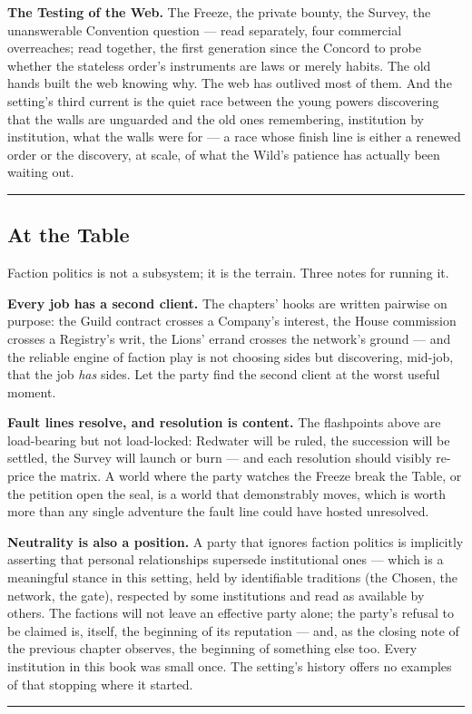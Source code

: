 \textbf{The Testing of the Web.} The Freeze, the private bounty, the Survey, the unanswerable Convention question --- read separately, four commercial overreaches; read together, the first generation since the Concord to probe whether the stateless order's instruments are laws or merely habits. The old hands built the web knowing why. The web has outlived most of them. And the setting's third current is the quiet race between the young powers discovering that the walls are unguarded and the old ones remembering, institution by institution, what the walls were for --- a race whose finish line is either a renewed order or the discovery, at scale, of what the Wild's patience has actually been waiting out.

\medskip\hrule\medskip

\subsection{At the Table}

Faction politics is not a subsystem; it is the terrain. Three notes for running it.

\textbf{Every job has a second client.} The chapters' hooks are written pairwise on purpose: the Guild contract crosses a Company's interest, the House commission crosses a Registry's writ, the Lions' errand crosses the network's ground --- and the reliable engine of faction play is not choosing sides but discovering, mid-job, that the job \textit{has} sides. Let the party find the second client at the worst useful moment.

\textbf{Fault lines resolve, and resolution is content.} The flashpoints above are load-bearing but not load-locked: Redwater will be ruled, the succession will be settled, the Survey will launch or burn --- and each resolution should visibly re-price the matrix. A world where the party watches the Freeze break the Table, or the petition open the seal, is a world that demonstrably moves, which is worth more than any single adventure the fault line could have hosted unresolved.

\textbf{Neutrality is also a position.} A party that ignores faction politics is implicitly asserting that personal relationships supersede institutional ones --- which is a meaningful stance in this setting, held by identifiable traditions (the Chosen, the network, the gate), respected by some institutions and read as available by others. The factions will not leave an effective party alone; the party's refusal to be claimed is, itself, the beginning of its reputation --- and, as the closing note of the previous chapter observes, the beginning of something else too. Every institution in this book was small once. The setting's history offers no examples of that stopping where it started.

\medskip\hrule\medskip
